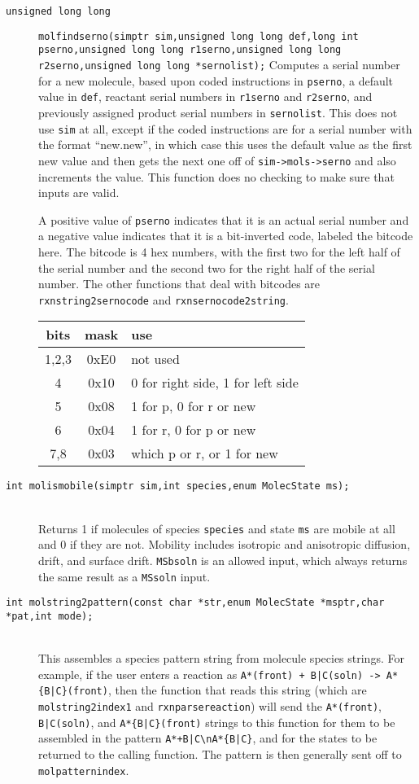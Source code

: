 \documentclass {scrbook}
\newcommand {\ttt} {\texttt}
\begin{document}
\begin{description}
\item[\ttt{unsigned long long}]
\ttt{molfindserno(simptr sim,unsigned long long def,long int pserno,unsigned long long r1serno,unsigned long long r2serno,unsigned long long *sernolist);}
\hfill
Computes a serial number for a new molecule, based upon coded instructions in \ttt{pserno}, a default value in \ttt{def}, reactant serial numbers in \ttt{r1serno} and \ttt{r2serno}, and previously assigned product serial numbers in \ttt{sernolist}. This does not use \ttt{sim} at all, except if the coded instructions are for a serial number with the format ``new.new'', in which case this uses the default value as the first new value and then gets the next one off of \ttt{sim->mols->serno} and also increments the value. This function does no checking to make sure that inputs are valid.

A positive value of \ttt{pserno} indicates that it is an actual serial number and a negative value indicates that it is a bit-inverted code, labeled the bitcode here. The bitcode is 4 hex numbers, with the first two for the left half of the serial number and the second two for the right half of the serial number. The other functions that deal with bitcodes are \ttt{rxnstring2sernocode} and \ttt{rxnsernocode2string}.

\begin{longtable}[c]{ccl}
bits & mask & use\\
\hline
1,2,3 & 0xE0 & not used\\
4 & 0x10 & 0 for right side, 1 for left side\\
5 & 0x08 & 1 for p, 0 for r or new\\
6 & 0x04 & 1 for r, 0 for p or new\\
7,8 & 0x03 & which p or r, or 1 for new
\end{longtable}

\item[\ttt{int molismobile(simptr sim,int species,enum MolecState ms);}]
\hfill \\
Returns 1 if molecules of species \ttt{species} and state \ttt{ms} are mobile at all and 0 if they are not. Mobility includes isotropic and anisotropic diffusion, drift, and surface drift. \ttt{MSbsoln} is an allowed input, which always returns the same result as a \ttt{MSsoln} input.

\item[\ttt{int molstring2pattern(const char *str,enum MolecState *msptr,char *pat,int mode);}]
\hfill \\
This assembles a species pattern string from molecule species strings. For example, if the user enters a reaction as \ttt{A*(front) + B|C(soln) -> A*\{B|C\}(front)}, then the function that reads this string (which are \ttt{molstring2index1} and \ttt{rxnparsereaction}) will send the \ttt{A*(front)}, \ttt{B|C(soln)}, and \ttt{A*\{B|C\}(front)} strings to this function for them to be assembled in the pattern \ttt{A*+B|C\textbackslash nA*\{B|C\}}, and for the states to be returned to the calling function. The pattern is then generally sent off to \ttt{molpatternindex}.


\end{description}
\end{document}
